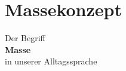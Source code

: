 \section{Massekonzept}

   \begin{frame}
   \begin{center} \begin{spacing}{2}
       \Large Der Begriff \\ \LARGE \textbf{Masse} \\ \Large in unserer Alltagssprache
   \end{spacing}\end{center}
   
   \end{frame}
